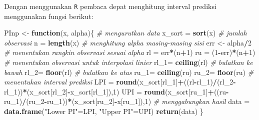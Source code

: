 \documentclass[]{book}
\newenvironment{Shaded}{\begin{snugshade}}{\end{snugshade}}
\newcommand{\KeywordTok}[1]{\textcolor[rgb]{0.13,0.29,0.53}{\textbf{#1}}}
\newcommand{\DecValTok}[1]{\textcolor[rgb]{0.00,0.00,0.81}{#1}}
\newcommand{\StringTok}[1]{\textcolor[rgb]{0.31,0.60,0.02}{#1}}
\newcommand{\CommentTok}[1]{\textcolor[rgb]{0.56,0.35,0.01}{\textit{#1}}}
\newcommand{\ControlFlowTok}[1]{\textcolor[rgb]{0.13,0.29,0.53}{\textbf{#1}}}
\newcommand{\OperatorTok}[1]{\textcolor[rgb]{0.81,0.36,0.00}{\textbf{#1}}}
\newcommand{\NormalTok}[1]{#1}
\begin{document}
Dengan menggunakan \texttt{R} pembaca depat menghitung interval prediksi
menggunakan fungsi berikut:

\begin{Shaded}
\begin{Highlighting}[]
\NormalTok{PInp <-}\StringTok{ }\ControlFlowTok{function}\NormalTok{(x, alpha)\{}
  \CommentTok{# mengurutkan data}
\NormalTok{  x_sort =}\StringTok{ }\KeywordTok{sort}\NormalTok{(x)}
  \CommentTok{# jumlah observasi}
\NormalTok{  n =}\StringTok{ }\KeywordTok{length}\NormalTok{(x)}
  \CommentTok{# menghitung alpha masing-masing sisi}
\NormalTok{  err <-}\StringTok{ }\NormalTok{alpha}\OperatorTok{/}\DecValTok{2}
  \CommentTok{# menentukan rangkin observasi sesuai alpha}
\NormalTok{  rl =}\StringTok{ }\NormalTok{err}\OperatorTok{*}\NormalTok{(n}\OperatorTok{+}\DecValTok{1}\NormalTok{)}
\NormalTok{  ru =}\StringTok{ }\NormalTok{(}\DecValTok{1}\OperatorTok{-}\NormalTok{err)}\OperatorTok{*}\NormalTok{(n}\OperatorTok{+}\DecValTok{1}\NormalTok{)}
  \CommentTok{# menentukan observasi untuk interpolasi linier}
\NormalTok{  rl_}\DecValTok{1}\NormalTok{=}\StringTok{ }\KeywordTok{ceiling}\NormalTok{(rl) }\CommentTok{# bulatkan ke bawah}
\NormalTok{  rl_}\DecValTok{2}\NormalTok{=}\StringTok{ }\KeywordTok{floor}\NormalTok{(rl) }\CommentTok{# bulatkan ke atas}
\NormalTok{  ru_}\DecValTok{1}\NormalTok{=}\StringTok{ }\KeywordTok{ceiling}\NormalTok{(ru) }
\NormalTok{  ru_}\DecValTok{2}\NormalTok{=}\StringTok{ }\KeywordTok{floor}\NormalTok{(ru)}
  \CommentTok{# menentukan interval prediksi}
\NormalTok{  LPI =}\StringTok{ }\KeywordTok{round}\NormalTok{(x_sort[rl_}\DecValTok{1}\NormalTok{]}\OperatorTok{+}\NormalTok{((rl}\OperatorTok{-}\NormalTok{rl_}\DecValTok{1}\NormalTok{)}\OperatorTok{/}\NormalTok{(rl_}\DecValTok{2}\OperatorTok{-}\NormalTok{rl_}\DecValTok{1}\NormalTok{))}\OperatorTok{*}\NormalTok{(x_sort[rl_}\DecValTok{2}\NormalTok{]}\OperatorTok{-}\NormalTok{x_sort[rl_}\DecValTok{1}\NormalTok{]),}\DecValTok{1}\NormalTok{)}
\NormalTok{  UPI =}\StringTok{ }\KeywordTok{round}\NormalTok{(x_sort[ru_}\DecValTok{1}\NormalTok{]}\OperatorTok{+}\NormalTok{((ru}\OperatorTok{-}\NormalTok{ru_}\DecValTok{1}\NormalTok{)}\OperatorTok{/}\NormalTok{(ru_}\DecValTok{2}\OperatorTok{-}\NormalTok{ru_}\DecValTok{1}\NormalTok{))}\OperatorTok{*}\NormalTok{(x_sort[ru_}\DecValTok{2}\NormalTok{]}\OperatorTok{-}\NormalTok{x[ru_}\DecValTok{1}\NormalTok{]),}\DecValTok{1}\NormalTok{)}
  \CommentTok{# menggabungkan hasil}
\NormalTok{  data =}\StringTok{ }\KeywordTok{data.frame}\NormalTok{(}\StringTok{"Lower PI"}\NormalTok{=LPI,}
                    \StringTok{"Upper PI"}\NormalTok{=UPI)}
  \KeywordTok{return}\NormalTok{(data)}
\NormalTok{\}}
\end{Highlighting}
\end{Shaded}
\end{document}
